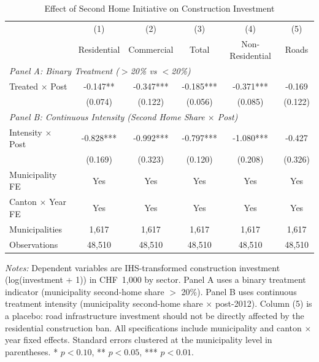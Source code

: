 \begin{table}[H]
\centering
\caption{Effect of Second Home Initiative on Construction Investment}
\label{tab:main}
\begin{threeparttable}
\footnotesize
\begin{tabular}{lccccc}
\toprule
 & (1) & (2) & (3) & (4) & (5) \\
 & Residential & Commercial & Total & Non-Residential & Roads \\
\midrule
\multicolumn{6}{l}{\textit{Panel A: Binary Treatment ($>$20\% vs $<$20\%)}} \\
[0.3em]
Treated $\times$ Post & -0.147** & -0.347*** & -0.185*** & -0.371*** & -0.169 \\
 & (0.074) & (0.122) & (0.056) & (0.085) & (0.122) \\
[0.5em]
\multicolumn{6}{l}{\textit{Panel B: Continuous Intensity (Second Home Share $\times$ Post)}} \\
[0.3em]
Intensity $\times$ Post & -0.828*** & -0.992*** & -0.797*** & -1.080*** & -0.427 \\
 & (0.169) & (0.323) & (0.120) & (0.208) & (0.326) \\
[0.5em]
\midrule
Municipality FE & Yes & Yes & Yes & Yes & Yes \\
Canton $\times$ Year FE & Yes & Yes & Yes & Yes & Yes \\
Municipalities & 1,617 & 1,617 & 1,617 & 1,617 & 1,617 \\
Observations & 48,510 & 48,510 & 48,510 & 48,510 & 48,510 \\
\bottomrule
\end{tabular}
\begin{tablenotes}[flushleft]
\small
\item \textit{Notes:} Dependent variables are IHS-transformed construction investment (log(investment + 1)) in CHF~1,000 by sector. Panel A uses a binary treatment indicator (municipality second-home share $>$ 20\%). Panel B uses continuous treatment intensity (municipality second-home share $\times$ post-2012). Column (5) is a placebo: road infrastructure investment should not be directly affected by the residential construction ban. All specifications include municipality and canton $\times$ year fixed effects. Standard errors clustered at the municipality level in parentheses. * $p<0.10$, ** $p<0.05$, *** $p<0.01$.
\end{tablenotes}
\end{threeparttable}
\end{table}

